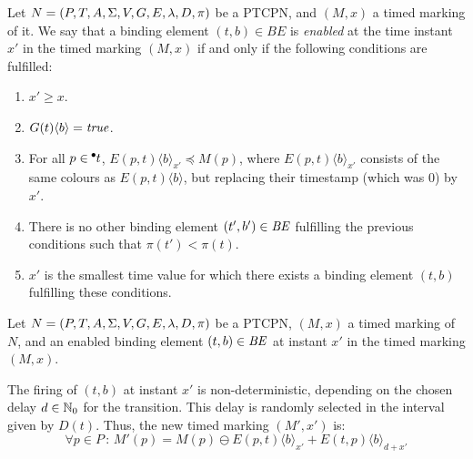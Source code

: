 \begin{definition}\label{permitidas}
Let $N=(P,T,A,\Sigma,V,G,E,\lambda,D,\pi)$ be a PTCPN,
and $(M,x)$ a timed marking of it.
We say that a 
binding element $(t,b) \in \mathit{BE}$
is {\em enabled} at the time instant $x'$ in the timed marking
$(M,x)$ if and
only if the following conditions are fulfilled:

\begin{enumerate}
\item $x' \geq x$.
%
\item $G(t)\langle b \rangle = {\it true}$.
%
\item For all $p \in \hspace*{-0.4em}~^{\bullet} \hspace*{-0.05em}t$,
$E(p,t)\langle b\rangle_{x'} \preceq M(p)$, 
where 
%
$E(p,t)\langle b \rangle_{x'}$ consists of the same
colours as $E(p,t)\langle b \rangle$, but 
replacing their timestamp (which was $0$) by $x'$.
%
%
\item There is no other binding element $(t',b') \in {\it BE}$
fulfilling the previous conditions  such that $\pi(t') < \pi(t)$.
%
%
\item $x'$ is the smallest time value for which there exists
a binding element $(t,b)$ fulfilling these conditions.
%
\end{enumerate}
%
\end{definition}

\begin{definition} 
Let $N=(P,T,A,\Sigma,V,G,E,\lambda,D,\pi)$ be a PTCPN,
$(M,x)$ a timed marking of $N$, and an enabled
binding element $(t,b) \in {\it BE}$ at 
instant $x'$ in the timed marking $(M,x)$.

The firing of $(t,b)$ at instant $x'$ is non-deterministic,
depending on the chosen delay $d \in \mathbb{N}_{0}$ for the transition.
This delay is randomly selected in the interval given by $D(t)$. 
Thus, the new timed marking $(M',x')$ is: 
%
\[
  \forall p \in P\,:\,
  M'(p) = M(p) \ominus E(p,t)\langle b \rangle_{x'} + E(t,p)\langle b
 \rangle_{d+x'}
\]
%
\end{definition}

